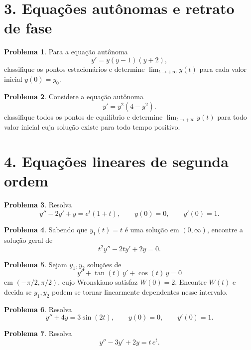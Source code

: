 \documentclass[10pt,a4paper]{amsart}
\theoremstyle{definition}
\newtheorem{problema}{Problema}
\begin{document}
\section*{3. Equações autônomas e retrato de fase}

\begin{problema}
Para a equação autônoma
\[
    y'=y(y-1)(y+2),
\]
classifique os pontos estacionários e determine
$\lim_{t\to+\infty}y(t)$ para cada valor inicial $y(0)=y_0$.
\end{problema}

\begin{problema}
Considere a equação autônoma
\[
    y'=y^2(4-y^2).
\]
classifique todos os pontos de equilíbrio e
determine $\lim_{t\to+\infty}y(t)$ para todo valor inicial cuja solução existe para todo tempo positivo.
\end{problema}

\section*{4. Equações lineares de segunda ordem}

\begin{problema}
Resolva
\[
    y''-2y'+y=e^t(1+t),
    \qquad y(0)=0,\qquad y'(0)=1.
\]
\end{problema}

\begin{problema}
Sabendo que $y_1(t)=t$ é uma solução em $(0,\infty)$, encontre a solução
geral de
\[
    t^2y''-2ty'+2y=0.
\]
\end{problema}

\begin{problema}
Sejam $y_1,y_2$ soluções de
\[
    y''+\tan(t)\,y'+\cos(t)\,y=0
\]
em $(-\pi/2,\pi/2)$, cujo Wronskiano satisfaz $W(0)=2$. Encontre $W(t)$ e
decida se $y_1,y_2$ podem se tornar linearmente dependentes nesse intervalo.
\end{problema}

\begin{problema}
Resolva
\[
    y''+4y=3\sin(2t),
    \qquad y(0)=0,
    \qquad y'(0)=1.
\]
\end{problema}

\begin{problema}
Resolva
\[
    y''-3y'+2y=t\,e^t.
\]
\end{problema}
\end{document}
